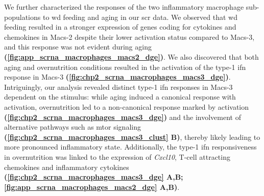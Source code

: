 \par We further characterized the responses of the two inflammatory macrophage sub-populations to \gls{wd} feeding and aging in our \gls{scr} data. We observed that \gls{wd} feeding resulted in a stronger expression of genes coding for cytokines and chemokines in Macs-2 despite their lower activation status compared to Macs-3, and this response was not evident during aging \textbf{(\autoref{fig:app_scrna_macrophages_macs2_dge})}. We also discovered that both aging and overnutrition conditions resulted in the activation of the type-1 \gls{ifn} response in Macs-3 \textbf{(\autoref{fig:chp2_scrna_macrophages_macs3_dge})}. Intriguingly, our analysis revealed distinct type-1 \gls{ifn} responses in Macs-3 dependent on the stimulus:  while aging induced a canonical response with  activation, overnutrition led to a non-canonical response marked by  activation \textbf{(\autoref{fig:chp2_scrna_macrophages_macs3_dge})} and the involvement of alternative pathways such as \gls{mtor} signaling \textbf{(\autoref{fig:chp2_scrna_macrophages_macs3_clust} B)}, thereby likely leading to more pronounced inflammatory state. Additionally, the type-1 \gls{ifn} responsiveness in overnutrition was linked to the expression of \textit{Cxcl10}, T-cell attracting chemokines and inflammatory cytokines \textbf{(\autoref{fig:chp2_scrna_macrophages_macs3_dge} A,B; \autoref{fig:app_scrna_macrophages_macs2_dge} A,B)}.

